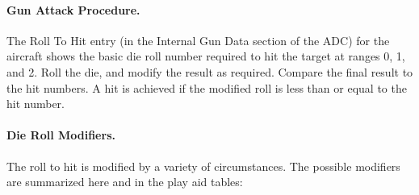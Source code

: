 \paragraph{Gun Attack Procedure.} The Roll To Hit entry (in the Internal Gun Data section of the ADC) for the aircraft shows the basic die roll number required to hit the target at ranges 0, 1, and 2. Roll the die, and modify the result as required. Compare the final result to the hit numbers. A hit is achieved if the modified roll is less than or equal to the hit number.

    
\paragraph{Die Roll Modifiers.} The roll to hit is modified by a variety of circumstances. The possible modifiers are summarized here and in the play aid tables:

